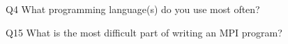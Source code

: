 \begin{description}%
\item{Q4} What programming language(s) do you use most often?%
\item{Q15} What is the most difficult part of writing an MPI program?%
\end{description}%
